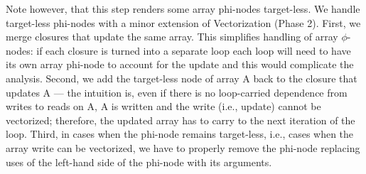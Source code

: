 Note however, that this step renders some array phi-nodes target-less. We handle target-less phi-nodes with a minor extension of Vectorization (Phase 2).
First, we merge closures that update the same array. This simplifies handling of array $\phi$-nodes: if each closure is turned into a separate loop
each loop will need to have its own array phi-node to account for the update and this would complicate the analysis.
Second, we add the target-less node of array {\sf A} back to the closure that updates {\sf A} ---
the intuition is, even if there is no loop-carried dependence from writes to reads on {\sf A}, {\sf A} is written and the write (i.e., update) cannot be vectorized;
therefore, the updated array has to carry to the next iteration of the loop. Third, in cases when the phi-node remains target-less, i.e., cases when the
array write can be vectorized, we have to properly remove the phi-node replacing uses of the left-hand side of the phi-node with its arguments.



